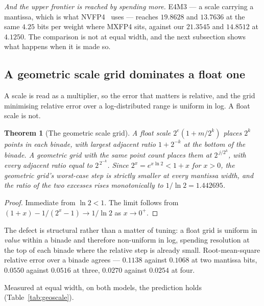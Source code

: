 \documentclass[11pt]{article}
\newtheorem{theorem}{Theorem}
\theoremstyle{definition}
\begin{document}
\emph{And the upper frontier is reached by spending more.} E4M3 --- a scale
carrying a mantissa, which is what NVFP4~\cite{nvfp4} uses --- reaches
$19.8628$ and $13.7636$ at the same $4.25$ bits per weight where MXFP4 sits,
against our $21.3545$ and $14.8512$ at $4.1250$. The comparison is not at equal
width, and the next subsection shows what happens when it is made so.

\subsection{A geometric scale grid dominates a float one}\label{sec:geoscale}

A scale is read as a multiplier, so the error that matters is relative, and the
grid minimising relative error over a log-distributed range is uniform in log.
A float scale is not.

\begin{theorem}[The geometric scale grid]\label{thm:geoscale}
A float scale $2^{e}(1+m/2^{k})$ places $2^{k}$ points in each binade, with
largest adjacent ratio $1+2^{-k}$ at the bottom of the binade. A geometric grid
with the same point count places them at $2^{\,j/2^{k}}$, with every adjacent
ratio equal to $2^{\,2^{-k}}$. Since $2^{x}=e^{x\ln 2}<1+x$ for $x>0$, the
geometric grid's worst-case step is strictly smaller at every mantissa width,
and the ratio of the two excesses rises monotonically to $1/\ln 2 = 1.442695$.
\end{theorem}

\begin{proof}
Immediate from $\ln 2 < 1$. The limit follows from
$(1+x)-1 \big/ (2^{x}-1) \to 1/\ln 2$ as $x\to0^{+}$.
\end{proof}

The defect is structural rather than a matter of tuning: a float grid is uniform
in \emph{value} within a binade and therefore non-uniform in log, spending
resolution at the top of each binade where the relative step is already small.
Root-mean-square relative error over a binade agrees --- $0.1138$ against
$0.1068$ at two mantissa bits, $0.0550$ against $0.0516$ at three, $0.0270$
against $0.0254$ at four.

Measured at equal width, on both models, the prediction holds
(Table~\ref{tab:geoscale}).
\end{document}
